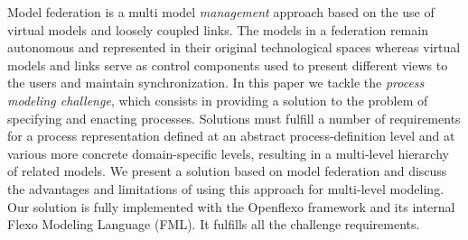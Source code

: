 Model federation is a multi model \emph{management} approach based on the use of virtual models and loosely coupled links. The models in a federation remain autonomous and represented in their original technological spaces whereas virtual models and links serve as control components used to present different views to the users and  maintain synchronization. In this paper we tackle the \emph{process modeling challenge}, which consists in providing a solution to the problem of specifying and enacting processes. Solutions must fulfill a number of requirements for a process representation defined at an abstract process-definition level and at various more concrete domain-specific levels, resulting in a multi-level hierarchy of related models. We present a solution based on model federation and discuss the advantages and limitations of using this approach for multi-level modeling. Our solution is fully implemented with the Openflexo framework and its internal Flexo Modeling Language (FML). It fulfills all the challenge requirements.


